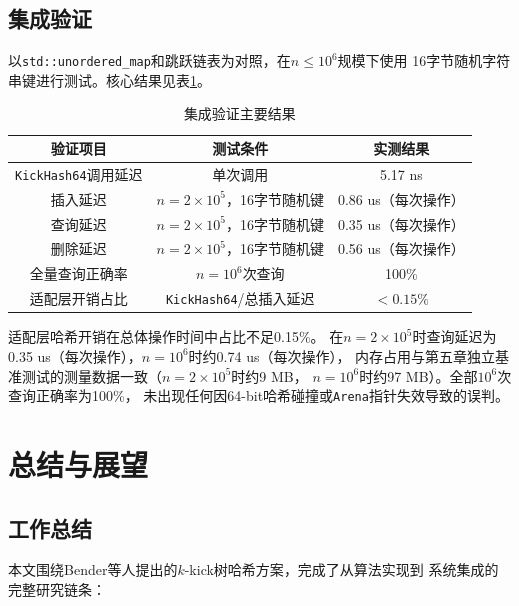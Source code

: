 \documentclass[
    type = bachelor,
    fontset = win,
    decl-page = true,
  ]{njuthesis}
\begin{document}
\section{集成验证}

以\texttt{std::unordered\_map}和跳跃链表为对照，在$n\leq 10^6$规模下使用
16字节随机字符串键进行测试。核心结果见表\ref{tab:integration_eval}。

\begin{table}[H]
\centering
\begin{tabular}{c|c|c}
\toprule
验证项目 & 测试条件 & 实测结果 \\
\midrule
\texttt{KickHash64}调用延迟 & 单次调用 & 5.17 ns \\
插入延迟 & $n=2\times10^5$，16字节随机键 & 0.86 us（每次操作） \\
查询延迟 & $n=2\times10^5$，16字节随机键 & 0.35 us（每次操作） \\
删除延迟 & $n=2\times10^5$，16字节随机键 & 0.56 us（每次操作） \\
全量查询正确率 & $n=10^6$次查询 & 100\% \\
适配层开销占比 & \texttt{KickHash64}/总插入延迟 & $<0.15\%$ \\
\bottomrule
\end{tabular}
\caption{集成验证主要结果}
\label{tab:integration_eval}
\end{table}

适配层哈希开销在总体操作时间中占比不足0.15\%。
在$n=2\times10^5$时查询延迟为0.35 us（每次操作），$n=10^6$时约0.74 us（每次操作），
内存占用与第五章独立基准测试的测量数据一致（$n=2\times10^5$时约9 MB，
$n=10^6$时约97 MB）。全部$10^6$次查询正确率为100\%，
未出现任何因64-bit哈希碰撞或\texttt{Arena}指针失效导致的误判。

\chapter{总结与展望}

\section{工作总结}

本文围绕Bender等人提出的$k$-kick树哈希方案\cite{1}，完成了从算法实现到
系统集成的完整研究链条：
\end{document}
